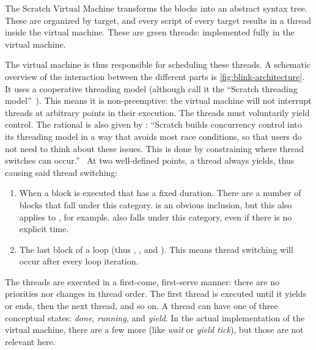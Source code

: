 \documentclass[../main]{subfiles}
\begin{document}
The Scratch Virtual Machine transforms the blocks into an abstract syntax tree.
These are organized by target, and every script of every target results in a thread inside the virtual machine.
These are green threads: implemented fully in the virtual machine.

The virtual machine is thus responsible for scheduling these threads.
A schematic overview of the interaction between the different parts is \vref{fig:blink-architecture}.
It uses a cooperative threading model (although \citeauthor{maloneyScratchProgrammingLanguage2010a} call it the ``Scratch threading model''~\autocite{maloneyScratchProgrammingLanguage2010a}).
This means it is non-preemptive: the virtual machine will not interrupt threads at arbitrary points in their execution.
The threads must voluntarily yield control.
The rational is also given by \citeauthor{maloneyScratchProgrammingLanguage2010a}: ``Scratch builds concurrency control into its threading model in a way that avoids most race conditions, so that users do not need to think about these issues.
This is done by constraining where thread switches can occur.''~\autocite{maloneyScratchProgrammingLanguage2010a}
At two well-defined points, a thread always yields, thus causing said thread switching:

\begin{enumerate}
    \item When a block is executed that has a fixed duration.
        There are a number of blocks that fall under this category.
         is an obvious inclusion, but this also applies to , for example.
         also falls under this category, even if there is no explicit time.
    \item The last block of a loop (thus , , and ).
        This means thread switching will occur after every loop iteration.
\end{enumerate}

The threads are executed in a first-come, first-serve manner: there are no priorities nor changes in thread order.
The first thread is executed until it yields or ends, then the next thread, and so on.
A thread can have one of three conceptual states: \emph{done}, \emph{running}, and \emph{yield}.
In the actual implementation of the virtual machine, there are a few more (like \emph{wait} or \emph{yield tick}), but those are not relevant here.
\end{document}
